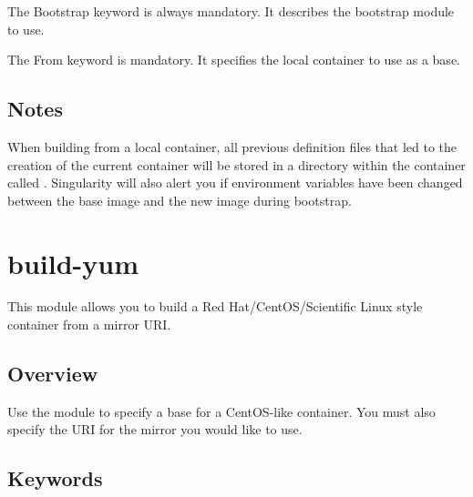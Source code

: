 \documentclass[letterpaper,10pt,english]{sphinxmanual}
\begin{document}
The Bootstrap keyword is always mandatory. It describes the bootstrap module to use.

%
\begin{sphinxVerbatim}[commandchars=\\\{\}]
 
\end{sphinxVerbatim}

The From keyword is mandatory. It specifies the local container to use as a base.


\subsection{Notes}
\label{\detokenize{appendix:id7}}
When building from a local container, all previous definition files that led to the creation of the current container will be stored in a
directory within the container called . Singularity will also alert you if environment variables have been
changed between the base image and the new image during bootstrap.


\section{build-yum}
\label{\detokenize{appendix:build-yum}}\label{\detokenize{appendix:sec-build-yum}}
This module allows you to build a Red Hat/CentOS/Scientific Linux style container from a mirror URI.


\subsection{Overview}
\label{\detokenize{appendix:id8}}
Use the  module to specify a base for a CentOS-like container. You must also specify the URI for the mirror you would like to use.


\subsection{Keywords}
\label{\detokenize{appendix:id9}}
%
\begin{sphinxVerbatim}[commandchars=\\\{\}]
 
\end{sphinxVerbatim}
\end{document}
